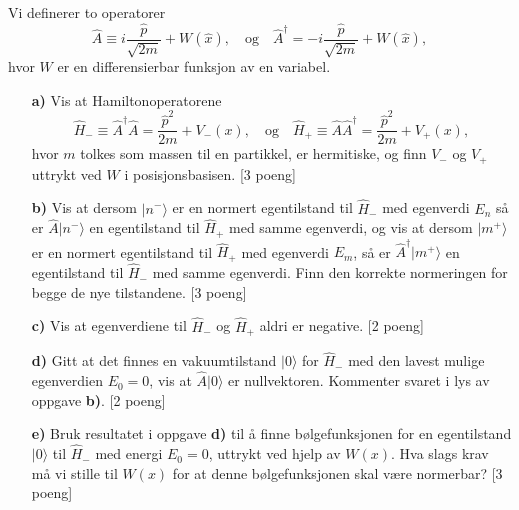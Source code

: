 \documentclass[11pt,a4paper]{report}
\newcounter{excount}[chapter]
\newenvironment{exercise}[1][]{\addtocounter{excount}{1} \noindent {\bf Oppgave
    \arabic{excount} \ \ #1}\hspace{2mm}}{\vspace{4mm}}
\begin{document}
\begin{exercise}{\bf En super symmetri\\}


Vi definerer to operatorer 
\begin{equation}
\hat A \equiv i\frac{\hat p}{\sqrt{2m}}+W(\hat x), 
\quad \text{og} \quad
\hat A^\dagger = -i\frac{\hat p}{\sqrt{2m}}+W(\hat x),
\end{equation}
hvor $W$ er en differensierbar funksjon av en variabel.

\begin{itemize}
\item[{\bf a)}] 
Vis at Hamiltonoperatorene 
\begin{equation}
    \hat H_-\equiv \hat A^\dagger\hat A = \frac{\hat p^2}{2m}+V_-(x)
    , \quad \text{og} \quad
    \hat H_+\equiv \hat A\hat A^\dagger= \frac{\hat p^2}{2m}+V_+(x),
    \label{eq:Hamilton_def}
\end{equation}
hvor $m$ tolkes som massen til en partikkel, er hermitiske, og finn $V_-$ og $V_+$ uttrykt ved $W$ i posisjonsbasisen. 
[3 poeng]

\item[{\bf b)}] 
Vis at dersom $|n^-\rangle$ er en normert egentilstand til $\hat H_-$ med egenverdi $E_n$ så er $\hat A|n^-\rangle$ en egentilstand til $\hat H_+$  med samme egenverdi, og vis at dersom $|m^+\rangle$ er en normert egentilstand til $\hat H_+$ med egenverdi $E_m$, så er $\hat A^\dagger|m^+\rangle$ en egentilstand til $\hat H_-$ med samme egenverdi. Finn den korrekte normeringen for begge de nye tilstandene. [3 poeng]
\item[{\bf c)}] Vis at egenverdiene til $\hat H_-$ og $\hat H_+$ aldri er negative. [2 poeng]

\item[{\bf d)}] Gitt at det finnes en vakuumtilstand $|0\rangle$ for $\hat H_-$ med den lavest mulige egenverdien $E_0=0$, vis at $\hat A|0\rangle$ er nullvektoren. Kommenter svaret i lys av oppgave {\bf b)}. [2 poeng]

\item[{\bf e)}] Bruk resultatet i oppgave {\bf d)} til å finne bølgefunksjonen for en egentilstand $|0\rangle$ til $\hat H_-$ med energi $E_0=0$, uttrykt ved hjelp av $W(x)$. Hva slags krav må vi stille til $W(x)$ for at denne bølgefunksjonen skal være normerbar? [3 poeng]


\end{itemize}
\end{exercise}
\end{document}
